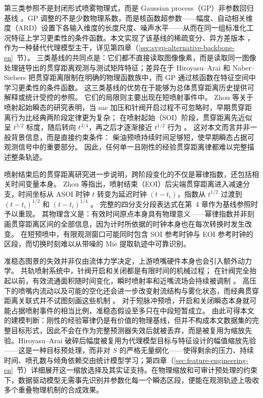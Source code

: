 第三类参照不是封闭形式喷雾物理式，而是 Gaussian process（GP）非参数回归基线 \cite{RasmussenWilliams2006}。GP 调整的不是少数物理系数，而是核函数超参数——幅度、自动相关维度（ARD）设置下各输入维度的长度尺度、噪声水平——从而在同一组标准化工况特征上学习更柔性的条件函数。本文实现了该基线的稀疏变分、异方差版本 \cite{HensmanFusiLawrence2013}，作为一种替代代理模型主干，详见第四章（\ref{sec:svgp-alternative-backbone-en}~节）。
三类基线的共同点是：它们都不直接读取图像像素，而是读取同一图像处理链导出的贯穿距离观测与测试矩阵特征；差异在于 Hiroyasu--Arai 和 Naber--Siebers 把贯穿距离限制在明确的物理函数族中，而 GP 通过核函数在特征空间中学习更柔性的条件函数。
这三类基线的优势在于能够为总体贯穿距离历史提供可解释或统计受控的参照。
它们的局限则主要出现在短喷射事件中。
Zhou 等关于喷射起始瞬态的研究表明，当 sac 加压和针阀开启过程不可忽略时，早期贯穿距离行为比经典两阶段定律更为复杂；
在喷射起始（SOI）阶段，贯穿距离先近似呈 \(t^{3/2}\) 标度，随后转向 \(t^{3/4}\)，再之后才逐渐接近 \(t^{1/2}\) 行为 \cite{ZhouLiYi2021}。
这对本文而言并非一般背景信息，而是直接约束条件：
柴油预喷持续时间足够短，使早期瞬态占据可观测信号中的重要部分。
因此，任何单一且刚性的经验贯穿距离律都难以完整描述整条轨迹。

喷射结束后的贯穿距离研究进一步说明，跨阶段变化的不仅是幂律指数，还包括相关时间变量本身。
Zhou 等指出，喷射结束（EOI）后尖端贯穿距离进入减速分支，时间坐标从 ASOI 时钟 $t$ 转变为延迟时钟 $(t-t_i)$，指数从 $t^{1/2}$ 过渡到 $(t-t_i)^{1/2}$ 和 $(t-t_i)^{1/4}$ \cite{ZhouLiLaiWei2019}。
完整的四分支分段表达式在第~4 章作为基线参照时予以重现。
其物理含义是：有效时间原点本身具有物理意义——幂律指数并非刻画贯穿距离区间的全部信息，因为计时所依据的时钟本身也在每次转换时发生改变。
在短预喷中，有限观测窗口可能同时包含 SOI 参考时钟与 EOI 参考时钟的区段，而切换时刻难以从带噪的 Mie 提取轨迹中可靠识别。

准稳态图景的失效并非仅由流体力学决定，上游喷嘴硬件本身也会引入额外动力学。
共轨喷射系统中，针阀开启和关闭都是有限时间的机械过程；
在针阀完全抬起以前，有效流通面积随时间变化，瞬时喷射率和近嘴流场会持续被调制
\cite{StumppRicco1996,HiroyasuArai1990}。
高压下的喷嘴内流动以及可能的空化还会进一步改变射流结构与雾化状态，而经典贯穿距离关联式并不试图刻画这些机制
\cite{liu2020sprayreview}。
对于短脉冲预喷，开启和关闭瞬态本身就可能占据喷射事件的相当比例，准稳态假设至多只在中段短暂成立。
由此可得本文的建模判断：刚性的经验幂律仍是有价值的物理基线，但并不构成本文数据集的完整目标形式，因此不会在作为完整预测器失效后就被丢弃，而是被复用为缩放先验。Hiroyasu--Arai 破碎后幅度被复用为代理模型目标与特征设计的幅值缩放先验——这是一种目标预处理，而非对 \(S\) 的严格无量纲化——使得剩余的压力、持续时间、喷孔数与倾角依赖交由统计模型学习；第四章（\ref{sec:feature-engineering-en}~节）详细展开这一缩放选择及其实证支持。在物理缩放和可审计预处理的约束下，数据驱动模型无需事先识别并参数化每一个瞬态区段，便能在观测轨迹上吸收多个重叠物理机制的合成效果。

